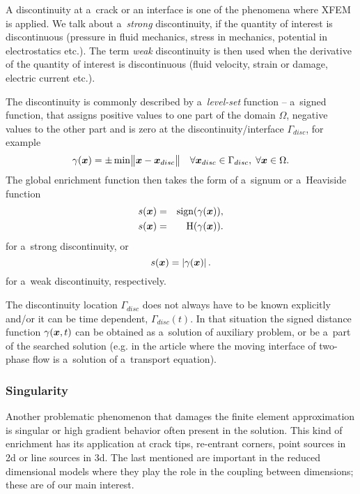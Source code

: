 A discontinuity at a~crack or an interface is one of the phenomena where XFEM is applied.
We talk about a~\emph{strong} discontinuity, if the quantity of interest is discontinuous (pressure in fluid mechanics, stress in mechanics, potential in electrostatics etc.).
The term \emph{weak} discontinuity is then used when the derivative of the quantity of interest is discontinuous (fluid velocity, strain or damage, electric current etc.).

The discontinuity is commonly described by a~\emph{level-set} function -- a~signed function,
that assigns positive values to one part of the domain $\Omega$, negative values to the other part and is zero at the discontinuity/interface $\Gamma_{disc}$, for example
\[
    \gamma(\mathbf{\boldsymbol{x}}) = \pm \min \bigl\Vert\mathbf{\boldsymbol{x}}-\mathbf{\boldsymbol{x}}_{disc}\bigr\Vert \quad \forall \mathbf{\boldsymbol{x}}_{disc} \in \Gamma_{disc},\; \forall \mathbf{\boldsymbol{x}} \in \Omega.
\]
The global enrichment function then takes the form of a~signum or a~Heaviside function
\begin{eqnarray}
    s(\mathbf{\boldsymbol{x}}) &=& \textrm{sign}(\gamma(\mathbf{\boldsymbol{x}})),\\
    s(\mathbf{\boldsymbol{x}}) &=& \textrm{H}(\gamma(\mathbf{\boldsymbol{x}})).
\end{eqnarray}
for a~strong discontinuity, or
\begin{equation}
    s(\mathbf{\boldsymbol{x}}) = \left|\gamma(\mathbf{\boldsymbol{x}})\right|.
\end{equation}
for a~weak discontinuity, respectively.

The discontinuity location $\Gamma_{disc}$ does not always have to be known explicitly and/or it can be time dependent, $\Gamma_{disc}(t)$.
In that situation the signed distance function $\gamma(\mathbf{\boldsymbol{x}},t)$ can be obtained as a~solution of auxiliary problem, or be a~part of
the searched solution (e.g. in the article \cite{sauerland_stable_2013}
where the moving interface of two-phase flow is a~solution of a~transport equation).


\subsubsection{Singularity} \label{sec:glob_enr_singularity}
Another problematic phenomenon that damages the finite element approximation is singular or high gradient behavior often present in the solution.
This kind of enrichment has its application at crack tips, re-entrant corners, point sources in 2d or line sources in 3d.
The last mentioned are important in the reduced dimensional models where they play the role in the coupling between dimensions;
these are of our main interest.

